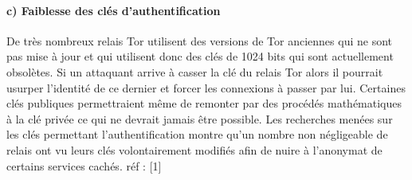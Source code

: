 \documentclass[]{article}
\let\oldparagraph\paragraph
\renewcommand{\paragraph}[1]{\oldparagraph{#1}\mbox{}}
\begin{document}
\paragraph{c) Faiblesse des clés
d'authentification}\label{c-faiblesse-des-cluxe9s-dauthentification}

De très nombreux relais Tor utilisent des versions de Tor anciennes qui
ne sont pas mise à jour et qui utilisent donc des clés de 1024 bits qui
sont actuellement obsolètes. Si un attaquant arrive à casser la clé du
relais Tor alors il pourrait usurper l'identité de ce dernier et forcer
les connexions à passer par lui. Certaines clés publiques permettraient
même de remonter par des procédés mathématiques à la clé privée ce qui
ne devrait jamais être possible. Les recherches menées sur les clés
permettant l'authentification montre qu'un nombre non négligeable de
relais ont vu leurs clés volontairement modifiés afin de nuire à
l'anonymat de certains services cachés. réf : {[}1{]}
\end{document}
